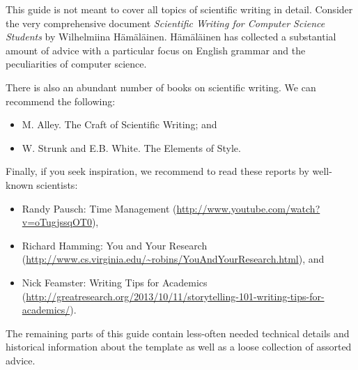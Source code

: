 This guide is not meant to cover all topics of scientific writing in detail. Consider the very comprehensive document \emph{Scientific Writing for Computer Science Students} by Wilhelmiina Hämäläinen.%
Hämäläinen has collected a substantial amount of advice with a particular focus on English grammar and the peculiarities of computer science.

There is also an abundant number of books on scientific writing. We can recommend the following:
\begin{itemize}
\item M. Alley. The Craft of Scientific Writing; and
\item W. Strunk and E.B. White. The Elements of Style.
\end{itemize}

Finally, if you seek inspiration, we recommend to read these reports by well-known scientists:
\begin{itemize}
\item Randy Pausch: Time Management (\url{http://www.youtube.com/watch?v=oTugjssqOT0}),
\item Richard Hamming: You and Your Research (\url{http://www.cs.virginia.edu/~robins/YouAndYourResearch.html}), and
\item Nick Feamster: Writing Tips for Academics (\url{http://greatresearch.org/2013/10/11/storytelling-101-writing-tips-for-academics/}).
\end{itemize}

The remaining parts of this guide contain less-often needed technical details and historical information about the template as well as a loose collection of assorted advice.